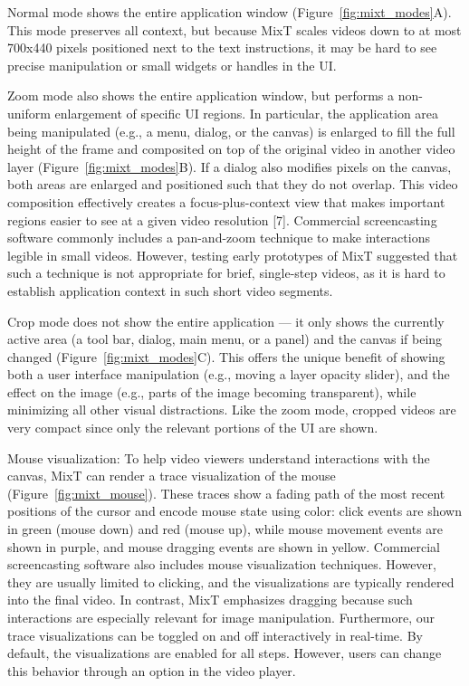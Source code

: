 Normal mode shows the entire application window (Figure~\ref{fig:mixt_modes}A). This mode preserves all context, but because MixT scales videos down to at most 700x440 pixels positioned next to the text instructions, it may be hard to see precise manipulation or small widgets or handles in the UI.

Zoom mode also shows the entire application window, but performs a non-uniform enlargement of specific UI regions. In particular, the application area being manipulated (e.g., a menu, dialog, or the canvas) is enlarged to fill the full height of the frame and composited on top of the original video in another video layer (Figure~\ref{fig:mixt_modes}B). If a dialog also modifies pixels on the canvas, both areas are enlarged and positioned such that they do not overlap. This video composition effectively creates a focus-plus-context view that makes important regions easier to see at a given video resolution [7]. Commercial screencasting software commonly includes a pan-and-zoom technique to make interactions legible in small videos. However, testing early prototypes of MixT suggested that such a technique is not appropriate for brief, single-step videos, as it is hard to establish application context in such short video segments.

Crop mode does not show the entire application — it only shows the currently active area (a tool bar, dialog, main menu, or a panel) and the canvas if being changed (Figure~\ref{fig:mixt_modes}C). This offers the unique benefit of showing both a user interface manipulation (e.g., moving a layer opacity slider), and the effect on the image (e.g., parts of the image becoming transparent), while minimizing all other visual distractions. Like the zoom mode, cropped videos are very compact since only the relevant portions of the UI are shown.

Mouse visualization: To help video viewers understand interactions with the canvas, MixT can render a trace visualization of the mouse (Figure~\ref{fig:mixt_mouse}). These traces show a fading path of the most recent positions of the cursor and encode mouse state using color: click events are shown in green (mouse down) and red (mouse up), while mouse movement events are shown in purple, and mouse dragging events are shown in yellow. Commercial screencasting software also includes mouse visualization techniques. However, they are usually limited to clicking, and the visualizations are typically rendered into the final video. In contrast, MixT emphasizes dragging because such interactions are especially relevant for image manipulation. Furthermore, our trace visualizations can be toggled on and off interactively in real-time. By default, the visualizations are enabled for all steps. However, users can change this behavior through an option in the video player.

